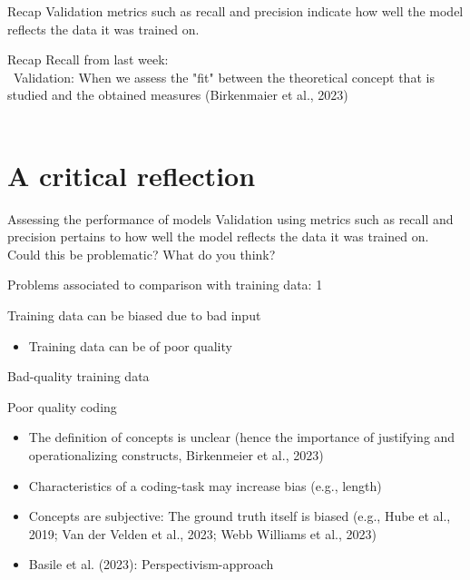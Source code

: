 \documentclass[compress]{beamer}
\begin{document}
\begin{frame}[fragile]{Recap} 	
Validation metrics such as recall and precision indicate how well the model reflects the data it was trained on. \\
\end{frame}

\begin{frame}{Recap}
Recall from last week: \\\
Validation: When we assess the "fit" between the theoretical concept that is studied and the obtained measures (Birkenmaier et al., 2023) \\\
\end{frame}


\section{A critical reflection}

\begin{frame}[fragile]{Assessing the performance of models} 	
Validation using metrics such as recall and precision pertains to how well the model reflects the data it was trained on. \\
Could this be problematic? What do you think?
\end{frame}


\begin{frame}[fragile]{Problems associated to comparison with training data: 1} 	
\begin{alertblock}{Training data can be biased due to bad input}
	\begin{itemize}
		\item Training data can be of poor quality
	\end{itemize}
\end{alertblock}
\end{frame}


\begin{frame}[fragile]{Bad-quality training data} 	
	\begin{alertblock}{Poor quality coding}
		\begin{itemize}
			\item The definition of concepts is unclear (hence the importance of justifying and operationalizing constructs, Birkenmeier et al., 2023)
			\item Characteristics of a coding-task may increase bias (e.g., length)
			\item Concepts are subjective: The ground truth itself is biased (e.g., Hube et al., 2019; Van der Velden et al., 2023; Webb Williams et al., 2023)
			\item Basile et al. (2023): Perspectivism-approach
		\end{itemize}
	\end{alertblock}
\end{frame}
\end{document}
